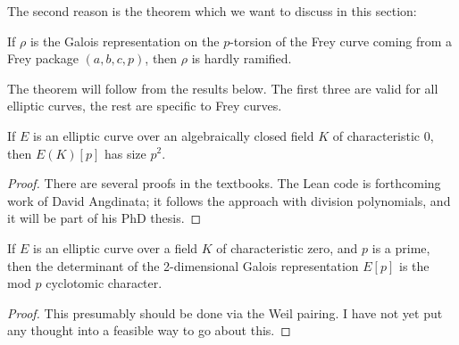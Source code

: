 %
%
%

The second reason is the theorem which we want to discuss in this section:

\begin{theorem}\label{frey_curve_hardly_ramified} If $\rho$ is the Galois representation on the $p$-torsion of the Frey curve coming from a Frey package $(a,b,c,p)$, then $\rho$ is hardly ramified.
\end{theorem}

The theorem will follow from the results below. The first three are valid for all elliptic curves, the rest are specific to Frey curves.

\begin{theorem}\label{Elliptic_curve_p_torsion_2d} If $E$ is an elliptic curve over an algebraically closed field $K$ of characteristic $0$, then $E(K)[p]$ has size $p^2$.
\end{theorem}
\begin{proof}
  There are several proofs in the textbooks. The Lean code is forthcoming work of David Angdinata; it follows the approach with division polynomials, and it will be part of his PhD thesis.
\end{proof}

\begin{theorem}\label{Elliptic_curve_det_p_torsion} If $E$ is an elliptic curve over a field $K$ of characteristic zero, and $p$ is a prime, then the determinant of the 2-dimensional Galois representation $E[p]$ is the mod $p$ cyclotomic character.
\end{theorem}
\begin{proof}
  This presumably should be done via the Weil pairing. I have not yet put any thought into a feasible way to go about this.
\end{proof}

